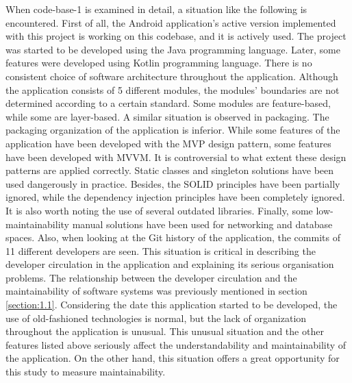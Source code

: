 When code-base-1 is examined in detail, a situation like the following is encountered. First of all, the Android application's active version implemented with this project is working on this codebase, and it is actively used. The project was started to be developed using the Java programming language. Later, some features were developed using Kotlin programming language. There is no consistent choice of software architecture throughout the application. Although the application consists of 5 different modules, the modules' boundaries are not determined according to a certain standard. Some modules are feature-based, while some are layer-based. A similar situation is observed in packaging. The packaging organization of the application is inferior. While some features of the application have been developed with the MVP design pattern, some features have been developed with MVVM. It is controversial to what extent these design patterns are applied correctly. Static classes and singleton solutions have been used dangerously in practice. Besides, the SOLID principles have been partially ignored, while the dependency injection principles have been completely ignored. It is also worth noting the use of several outdated libraries. Finally, some low-maintainability manual solutions have been used for networking and database spaces. Also, when looking at the Git history of the application, the commits of 11 different developers are seen. This situation is critical in describing the developer circulation in the application and explaining its serious organisation problems. The relationship between the developer circulation and the maintainability of software systems was previously mentioned in section \ref{section:1.1}. Considering the date this application started to be developed, the use of old-fashioned technologies is normal, but the lack of organization throughout the application is unusual. This unusual situation and the other features listed above seriously affect the understandability and maintainability of the application. On the other hand, this situation offers a great opportunity for this study to measure maintainability.

